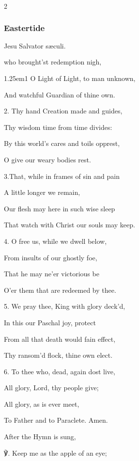 \begin{multicols}{2}
\subsubsection{Eastertide}

\begin{inhead}
	Jesu Salvator s{\ae}culi.
\end{inhead}
 who brought'st redemption nigh,\par
{}
\begin{hangparas}{1.25em}{1}
O Light of Light, to man unknown,\par
And watchful Guardian of thine own.\\
\par
2. Thy hand Creation made and guides,\par
Thy wisdom time from time divides:\par
By this world's cares and toils opprest,\par
O give our weary bodies rest.\\
\par
3.That, while in frames of sin and pain\par
A little longer we remain,\par
Our flesh may here in such wise sleep\par
That watch with Christ our souls may keep.\\
\par
4. O free us, while we dwell below,\par
From insults of our ghostly foe,\par
That he may ne'er victorious be\par
O'er them that are redeemed by thee.\\
\par
5. We pray thee, King with glory deck'd,\par
In this our Paschal joy, protect\par
From all that death would fain effect,\par
Thy ransom'd flock, thine own elect.\\
\par
6. To thee who, dead, again dost live,\par
All glory, Lord, thy people give;\par
All glory, as is ever meet,\par
To Father and to Paraclete. Amen.
\end{hangparas}


\begin{rubric}
	After the Hymn is sung,
\end{rubric}
℣. Keep me as the apple of an eye;


\end{multicols}
